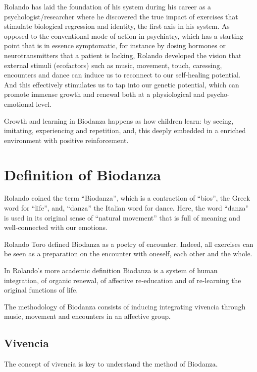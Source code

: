 \documentclass[
  11pt,
]{book}
\begin{document}
Rolando has laid the foundation of his system during his career as a psychologist/researcher where he discovered the true impact of exercises that stimulate biological regression and identity, the first axis in his system. As opposed to the conventional mode of action in psychiatry, which has a starting point that is in essence symptomatic, for instance by dosing hormones or neurotransmitters that a patient is lacking, Rolando developed the vision that external stimuli (ecofactors) such as music, movement, touch, caressing, encounters and dance can induce us to reconnect to our self-healing potential. And this effectively stimulates us to tap into our genetic potential, which can promote immense growth and renewal both at a physiological and psycho-emotional level.

Growth and learning in Biodanza happens as how children learn: by seeing, imitating, experiencing and repetition, and, this deeply embedded in a enriched environment with positive reinforcement.

\hypertarget{definition-of-biodanza}{%
\section{Definition of Biodanza}\label{definition-of-biodanza}}

Rolando coined the term ``Biodanza'', which is a contraction of ``bios'', the Greek word for ``life'', and, ``danza'' the Italian word for dance. Here, the word ``danza'' is used in its original sense of ``natural movement'' that is full of meaning and well-connected with our emotions.

Rolando Toro defined Biodanza as a poetry of encounter. Indeed, all exercises can be seen as a preparation on the encounter with oneself, each other and the whole.

In Rolando's more academic definition Biodanza is a system of human integration, of organic renewal, of affective re-education and of re-learning the original functions of life.

The methodology of Biodanza consists of inducing integrating vivencia through music, movement and encounters in an affective group.

\hypertarget{vivencia}{%
\subsection{Vivencia}\label{vivencia}}

The concept of vivencia is key to understand the method of Biodanza.
\end{document}
